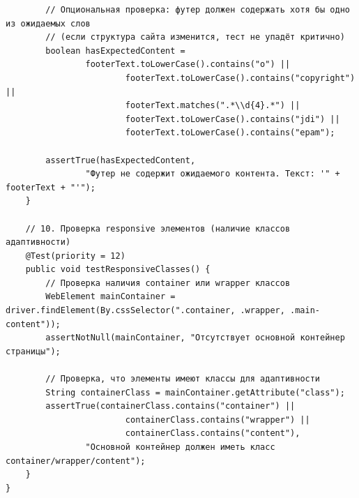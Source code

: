 \documentclass{article}[14pt]
\begin{document}
\begin{lstlisting}
        // Опциональная проверка: футер должен содержать хотя бы одно из ожидаемых слов
        // (если структура сайта изменится, тест не упадёт критично)
        boolean hasExpectedContent =
                footerText.toLowerCase().contains("o") ||
                        footerText.toLowerCase().contains("copyright") ||
                        footerText.matches(".*\\d{4}.*") ||
                        footerText.toLowerCase().contains("jdi") ||
                        footerText.toLowerCase().contains("epam");

        assertTrue(hasExpectedContent,
                "Футер не содержит ожидаемого контента. Текст: '" + footerText + "'");
    }

    // 10. Проверка responsive элементов (наличие классов адаптивности)
    @Test(priority = 12)
    public void testResponsiveClasses() {
        // Проверка наличия container или wrapper классов
        WebElement mainContainer = driver.findElement(By.cssSelector(".container, .wrapper, .main-content"));
        assertNotNull(mainContainer, "Отсутствует основной контейнер страницы");

        // Проверка, что элементы имеют классы для адаптивности
        String containerClass = mainContainer.getAttribute("class");
        assertTrue(containerClass.contains("container") ||
                        containerClass.contains("wrapper") ||
                        containerClass.contains("content"),
                "Основной контейнер должен иметь класс container/wrapper/content");
    }
}
\end{lstlisting}
\end{document}
